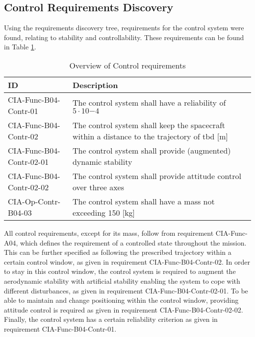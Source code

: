 \subsection{Control Requirements Discovery} \label{sec:req-control}
Using the requirements discovery tree, requirements for the control system were found, relating to stability and controllability. These requirements can be found in Table \ref{tab:controlreq}.

\begin{table}[H]
	\caption{Overview of Control requirements}
	\begin{tabular}{|p{}|p{}|}
		\hline
		ID         					&	Description																							\\ \hline \hline
		CIA-Func-B04-Contr-01		&	The control system shall have a reliability of $5 \cdot 10 {-4}$            									\\ \hline
		CIA-Func-B04-Contr-02 		&	The control system shall keep the spacecraft within a distance to the trajectory of \gls{tbd} [m]	\\ \hline	
		CIA-Func-B04-Contr-02-01 	&	The control system shall provide (augmented) dynamic stability       								\\ \hline
		CIA-Func-B04-Contr-02-02 	&	The control system shall provide attitude control over three axes         							\\ \hline	
		CIA-Op-Contr-B04-03	&	The control system shall have a mass not exceeding 150 [kg]  							\\ \hline
	\end{tabular}
	\label{tab:controlreq}
\end{table}

All control requirements, except for its mass, follow from requirement CIA-Func-A04, which defines the requirement of a controlled state throughout the mission. 
This can be further specified as following the prescribed trajectory within a certain control window, as given in requirement CIA-Func-B04-Contr-02. 
In order to stay in this control window, the control system is required to augment the aerodynamic stability with artificial stability enabling the system to cope with different disturbances, as given in requirement CIA-Func-B04-Contr-02-01. 
To be able to maintain and change positioning within the control window, providing attitude control is required as given in requirement CIA-Func-B04-Contr-02-02. 
Finally, the control system has a certain reliability criterion as given in requirement CIA-Func-B04-Contr-01.